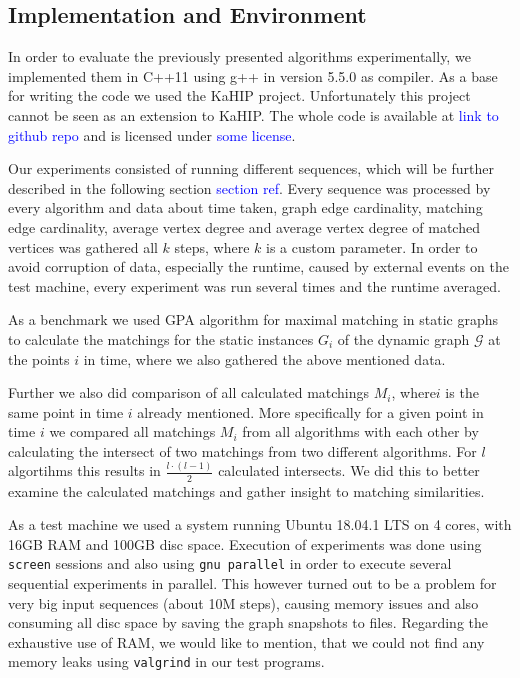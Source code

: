 \documentclass{article}      %
\newcommand\todo[1]{\textcolor{blue}{#1}}
\begin{document}
\subsection{Implementation and Environment}
\label{sec:impl-env}

In order to evaluate the previously presented algorithms experimentally, we implemented them in C++11 using g++ in version 5.5.0 as compiler. As a base for writing the code we used the KaHIP project. Unfortunately this project cannot be seen as an extension to KaHIP. The whole code is available at \todo{link to github repo} and is licensed under \todo{some license}.

Our experiments consisted of running different sequences, which will be further described in the following section \todo{section ref}. Every sequence was processed by every algorithm and data about time taken, graph edge cardinality, matching edge cardinality, average vertex degree and average vertex degree of matched vertices was gathered all $k$ steps, where $k$ is a custom parameter. In order to avoid corruption of data, especially the runtime, caused by external events on the test machine, every experiment was run several times and the runtime averaged.

As a benchmark we used GPA algorithm for maximal matching in static graphs to calculate the matchings for the static instances $G_i$ of the dynamic graph $\mathcal{G}$ at the points $i$ in time, where we also gathered the above mentioned data.

Further we also did comparison of all calculated matchings $M_i$, where$i$ is the same point in time $i$ already mentioned. More specifically for a given point in time $i$ we compared all matchings $M_i$ from all algorithms with each other by calculating the intersect of two matchings from two different algorithms. For $l$ algortihms this results in $\frac{l\cdot (l-1)}{2}$ calculated intersects. We did this to better examine the calculated matchings and gather insight to matching similarities.

As a test machine we used a system running Ubuntu 18.04.1 LTS on 4 cores, with 16GB RAM and 100GB disc space. Execution of experiments was done using \texttt{screen} sessions and also using \texttt{gnu parallel} in order to execute several sequential experiments in parallel. This however turned out to be a problem for very big input sequences (about 10M steps), causing memory issues and also consuming all disc space by saving the graph snapshots to files. Regarding the exhaustive use of RAM, we would like to mention, that we could not find any memory leaks using \texttt{valgrind} in our test programs.
\end{document}
